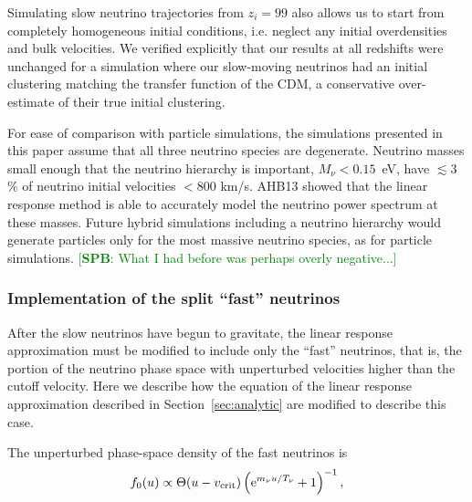 \documentclass[useAMS, usenatbib]{mnras}
\newcommand{\rme}{\textrm{e}}
\newcommand{\spb}[1]{{\textcolor{green}{[{\bf SPB}: #1]}}}
\begin{document}
Simulating slow neutrino trajectories from $z_i = 99$ also allows us to start from completely homogeneous initial conditions, i.e. neglect any initial overdensities and bulk velocities. We verified explicitly that our results at all redshifts were unchanged for a simulation where our slow-moving neutrinos had an initial clustering matching the transfer function of the CDM, a conservative over-estimate of their true initial clustering.

For ease of comparison with particle simulations, the simulations presented in this paper assume that all three neutrino species are degenerate. Neutrino masses small enough that the neutrino hierarchy is important, $M_\nu < 0.15$~eV, have $\lesssim 3$\% of neutrino initial velocities $< 800$ km/s. AHB13 showed that the linear response method is able to accurately model the neutrino power spectrum at these masses. Future hybrid simulations including a neutrino hierarchy would generate particles only for the most massive neutrino species, as for particle simulations. \spb{What I had before was perhaps overly negative...}


\subsubsection{Implementation of the split ``fast'' neutrinos}

After the slow neutrinos have begun to gravitate, the linear response approximation must be modified to include only the ``fast'' neutrinos, that is, the portion of the neutrino phase space with unperturbed velocities higher than the cutoff velocity. Here we describe how the equation of the linear response approximation described in Section~\ref{sec:analytic} are modified to describe this case.

The unperturbed phase-space density of the fast neutrinos is
\begin{equation}
f_0(u) \propto \Theta(u - v_{\rm crit}) \left(\rme^{m_\nu u/T_\nu} + 1 \right)^{-1},
\end{equation}
\end{document}
